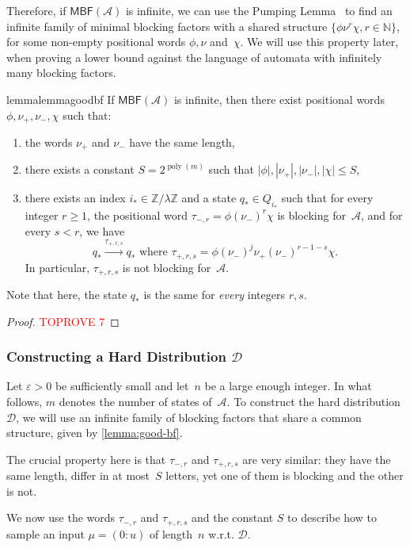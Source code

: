 \documentclass[letterpaper, USenglish, cleveref, autoref, thm-restate, numberwithinsect]{lipics-v2021}
\theoremstyle{theorem}
\theoremstyle{definition}
\DeclareMathOperator{\poly}{poly}
\newcommand{\Aa}{\mathcal{A}}
\newcommand{\Dd}{\mathcal{D}}
\newcommand{\eps}{\varepsilon}
\newcommand{\MBF}{\textsf{MBF}\xspace}
\newcommand{\NN}{\mathbb{N}}
\newcommand{\timedword}[2]{(#1:#2)}
\newcommand{\twu}{\timedword{0}{u}}
\newcommand{\ZZ}{\mathbb{Z}}
\begin{document}
Therefore, if $\MBF(\Aa)$ is infinite, we can use the Pumping Lemma~\cite[Chapter 1, Proposition 2.2]{Pin2021} to find an infinite family of minimal blocking factors with a shared structure $\{\phi \nu^r \chi, r\in\NN\}$, for some non-empty positional words $\phi, \nu$ and~$\chi$. We will use this property later, when proving a lower bound against the language of automata with infinitely many blocking factors.
\begin{restatable}{lemma}{lemmagoodbf}\label{lemma:good-bf}
    If $\MBF(\Aa)$ is infinite, then there exist positional words $\phi,\nu_+,\nu_-,\chi$ such that:
    \begin{enumerate}
        \item the words $\nu_+$ and $\nu_-$ have the same length,
        \item there exists a constant $ S = 2^{\poly(m)}$ such that $|\phi|, |\nu_+|, |\nu_-|, |\chi|\le  S$,
        \item there exists an index $i_*\in\ZZ/ \lambda\ZZ$ and a state $q_*\in Q_{i_*}$ such that for every integer $r \ge 1$,
        the positional word $\tau_{-,r} = \phi(\nu_-)^r\chi$ is blocking for~$\Aa$, and for every $s < r$, we have
        \[q_* \xrightarrow{\tau_{+,r,s}} q_* \text{ where } \tau_{+,r,s} = \phi(\nu_-)^j\nu_+(\nu_-)^{r-1-s}\chi.\]
        In particular, $\tau_{+,r,s}$ is not blocking for~$\Aa$.
    \end{enumerate}
\end{restatable}
Note that here, the state $q_*$ is the same for \emph{every} integers $r, s$.
\begin{proof}\textcolor{red}{TOPROVE 7}\end{proof}

\subsubsection{Constructing a Hard Distribution $\Dd$}
Let $\eps > 0$ be sufficiently small and let~$n$ be a large enough integer.
In what follows, $m$ denotes the number of states of~$\Aa$.
To construct the hard distribution $\Dd$, we will use an infinite family of blocking factors that share a common structure, given by \cref{lemma:good-bf}.

The crucial property here is that $\tau_{-,r}$ and $\tau_{+,r, s}$ are very similar: they have the same length, differ in at most~$S$ letters, yet one of them is blocking and the other is not.

We now use the words $\tau_{-,r}$ and $\tau_{+,r,s}$ and the constant $ S$ to describe how to sample an input $\mu = \twu$ of length~$n$ w.r.t. $\Dd$.
\end{document}
